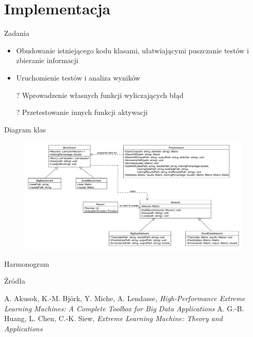 \documentclass{beamer}
\begin{document}
\section{Implementacja}
\begin{frame}{Zadania}
\begin{itemize}
\item Obudowanie istniejącego kodu klasami, ułatwiającymi puszczanie testów i zbieranie informacji
\item Uruchomienie testów i analiza wyników
\item[?] Wprowadzenie własnych funkcji wyliczających błąd 
\item[?] Przetestowanie innych funkcji aktywacji
\end{itemize}
\end{frame}

\begin{frame}{Diagram klas}
\begin{figure}
	\includegraphics[scale=0.26]{classes.png}
\end{figure}
\end{frame}


\begin{frame}{Harmonogram}

\end{frame}
\begin{frame}{Źródła}
\begin{thebibliography}{9}
  A. Akusok, K.-M. Björk, Y. Miche, A. Lendasse,
  \emph{High-Performance Extreme Learning Machines: A Complete Toolbox for Big Data Applications}
  A. G.-B. Huang, L. Chen, C.-K. Siew, 
  \emph{Extreme Learning Machine: Theory and Applications}
\end{thebibliography}
\end{frame}
\end{document}
